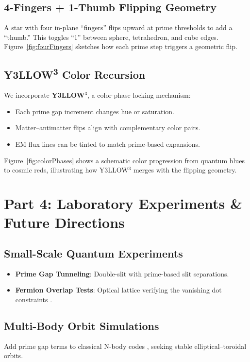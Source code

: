 \documentclass[11pt]{article}
\begin{document}
\subsection{4-Fingers + 1-Thumb Flipping Geometry}
A star with four in-plane “fingers” flips upward at prime thresholds to add a “thumb.” This toggles “1” between sphere, tetrahedron, and cube edges. Figure~\ref{fig:fourFingers} sketches how each prime step triggers a geometric flip.

\subsection{Y3LLOW\textsuperscript{3} Color Recursion}
We incorporate \textbf{Y3LLOW$^3$}, a color-phase locking mechanism:

\begin{itemize}
    \item Each prime gap increment changes hue or saturation.  
    \item Matter–antimatter flips align with complementary color pairs.  
    \item EM flux lines can be tinted to match prime-based expansions.
\end{itemize}

Figure~\ref{fig:colorPhases} shows a schematic color progression from quantum blues to cosmic reds, illustrating how Y3LLOW$^3$ merges with the flipping geometry.

\clearpage

\section{Part 4: Laboratory Experiments \& Future Directions}
\label{part4}

\subsection{Small-Scale Quantum Experiments}
\begin{itemize}
    \item \textbf{Prime Gap Tunneling}: Double-slit with prime-based slit separations.  
    \item \textbf{Fermion Overlap Tests}: Optical lattice verifying the vanishing dot constraints \cite{Pauli1925}.
\end{itemize}

\subsection{Multi-Body Orbit Simulations}
Add prime gap terms to classical N-body codes \cite{Poincare1892}, seeking stable elliptical–toroidal orbits.
\end{document}
